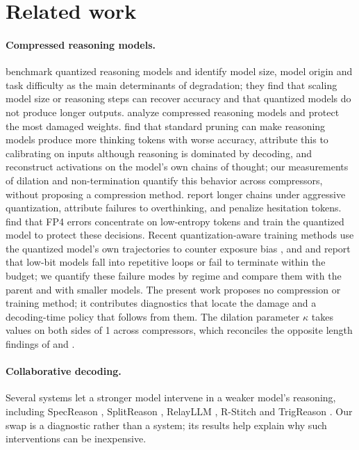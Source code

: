 \documentclass[10pt]{article}
\begin{document}
\section{Related work}

\paragraph{Compressed reasoning models.}
\citet{liu2025quantization} benchmark quantized reasoning models and identify model size, model origin and task difficulty as the main determinants of degradation; they find that scaling model size or reasoning steps can recover accuracy and that quantized models do not produce longer outputs. \citet{zhang2025compression} analyze compressed reasoning models and protect the most damaged weights. \citet{lucas2025rac} find that standard pruning can make reasoning models produce more thinking tokens with worse accuracy, attribute this to calibrating on inputs although reasoning is dominated by decoding, and reconstruct activations on the model's own chains of thought; our measurements of dilation and non-termination quantify this behavior across compressors, without proposing a compression method. \citet{lotfi2026quantized} report longer chains under aggressive quantization, attribute failures to overthinking, and penalize hesitation tokens. \citet{lee2026reqat} find that FP4 errors concentrate on low-entropy tokens and train the quantized model to protect these decisions. Recent quantization-aware training methods use the quantized model's own trajectories to counter exposure bias \citep{chen2026onpolicy,zheng2026rightonq,wang2026trace}, and \citet{chen2026onpolicy} and \citet{zheng2026rightonq} report that low-bit models fall into repetitive loops or fail to terminate within the budget; we quantify these failure modes by regime and compare them with the parent and with smaller models. The present work proposes no compression or training method; it contributes diagnostics that locate the damage and a decoding-time policy that follows from them. The dilation parameter $\kappa$ takes values on both sides of 1 across compressors, which reconciles the opposite length findings of \citet{liu2025quantization} and \citet{lotfi2026quantized}.

\paragraph{Collaborative decoding.}
Several systems let a stronger model intervene in a weaker model's reasoning, including SpecReason \citep{pan2025specreason}, SplitReason \citep{akhauri2025splitreason}, RelayLLM \citep{huang2026relayllm}, R-Stitch \citep{chen2025rstitch} and TrigReason \citep{zhao2026trigreason}. Our swap is a diagnostic rather than a system; its results help explain why such interventions can be inexpensive.
\end{document}

